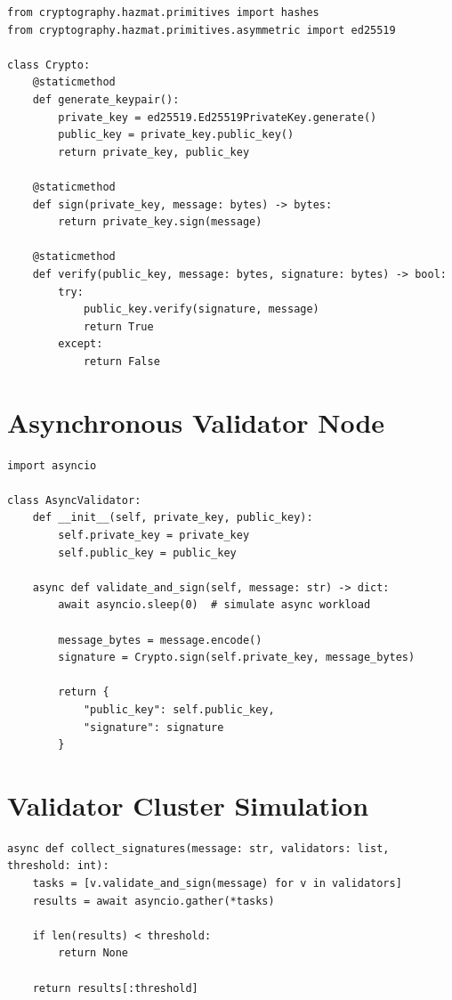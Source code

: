 \begin{verbatim}
from cryptography.hazmat.primitives import hashes
from cryptography.hazmat.primitives.asymmetric import ed25519

class Crypto:
    @staticmethod
    def generate_keypair():
        private_key = ed25519.Ed25519PrivateKey.generate()
        public_key = private_key.public_key()
        return private_key, public_key

    @staticmethod
    def sign(private_key, message: bytes) -> bytes:
        return private_key.sign(message)

    @staticmethod
    def verify(public_key, message: bytes, signature: bytes) -> bool:
        try:
            public_key.verify(signature, message)
            return True
        except:
            return False
\end{verbatim}

\section{Asynchronous Validator Node}

\begin{verbatim}
import asyncio

class AsyncValidator:
    def __init__(self, private_key, public_key):
        self.private_key = private_key
        self.public_key = public_key

    async def validate_and_sign(self, message: str) -> dict:
        await asyncio.sleep(0)  # simulate async workload

        message_bytes = message.encode()
        signature = Crypto.sign(self.private_key, message_bytes)

        return {
            "public_key": self.public_key,
            "signature": signature
        }
\end{verbatim}

\section{Validator Cluster Simulation}

\begin{verbatim}
async def collect_signatures(message: str, validators: list, threshold: int):
    tasks = [v.validate_and_sign(message) for v in validators]
    results = await asyncio.gather(*tasks)

    if len(results) < threshold:
        return None

    return results[:threshold]
\end{verbatim}

